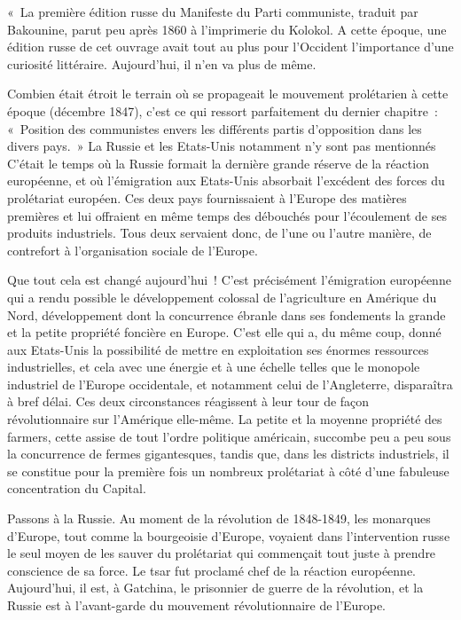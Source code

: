 \documentclass[french,twoside]{book} %
\newenvironment{quoteblock}%
  {\begin{quoting}}
  {\end{quoting}}
\newenvironment{quotebar}{%
    \def\FrameCommand{{\color{rubric!10!}\vrule width 0.5em} \hspace{0.9em}}%
    \def\OuterFrameSep{0pt} %
    \MakeFramed {\advance\hsize-\width \FrameRestore}
  }%
  {%
    \endMakeFramed
  }
\renewenvironment{quoteblock}%
  {%
    \savenotes
    \setstretch{0.9}
    \begin{quotebar}
    \smallskip
  }
  {%
    \smallskip
    \end{quotebar}
    \spewnotes
  }
\begin{document}
\begin{quoteblock}
 \noindent « La première édition russe du Manifeste du Parti communiste, traduit par Bakounine, parut peu après 1860 à l’imprimerie du Kolokol. A cette époque, une édition russe de cet ouvrage avait tout au plus pour l’Occident l’importance d’une curiosité littéraire. Aujourd’hui, il n’en va plus de même.\par
 Combien était étroit le terrain où se propageait le mouvement prolétarien à cette époque (décembre 1847), c’est ce qui ressort parfaitement du dernier chapitre : « Position des communistes envers les différents partis d’opposition dans les divers pays. » La Russie et les Etats-Unis notamment n’y sont pas mentionnés C’était le temps où la Russie formait la dernière grande réserve de la réaction européenne, et où l’émigration aux Etats-Unis absorbait l’excédent des forces du prolétariat européen. Ces deux pays fournissaient à l’Europe des matières premières et lui offraient en même temps des débouchés pour l’écoulement de ses produits industriels. Tous deux servaient donc, de l’une ou l’autre manière, de contrefort à l’organisation sociale de l’Europe.\par
 Que tout cela est changé aujourd’hui ! C'est précisément l’émigration européenne qui a rendu possible le développement colossal de l’agriculture en Amérique du Nord, développement dont la concurrence ébranle dans ses fondements la grande et la petite propriété foncière en Europe. C'est elle qui a, du même coup, donné aux Etats-Unis la possibilité de mettre en exploitation ses énormes ressources industrielles, et cela avec une énergie et à une échelle telles que le monopole industriel de l’Europe occidentale, et notamment celui de l’Angleterre, disparaîtra à bref délai. Ces deux circonstances réagissent à leur tour de façon révolutionnaire sur l’Amérique elle-même. La petite et la moyenne propriété des farmers, cette assise de tout l’ordre politique américain, succombe peu a peu sous la concurrence de fermes gigantesques, tandis que, dans les districts industriels, il se constitue pour la première fois un nombreux prolétariat à côté d’une fabuleuse concentration du Capital.\par
 Passons à la Russie. Au moment de la révolution de 1848-1849, les monarques d’Europe, tout comme la bourgeoisie d’Europe, voyaient dans l’intervention russe le seul moyen de les sauver du prolétariat qui commençait tout juste à prendre conscience de sa force. Le tsar fut proclamé chef de la réaction européenne. Aujourd’hui, il est, à Gatchina, le prisonnier de guerre de la révolution, et la Russie est à l’avant-garde du mouvement révolutionnaire de l’Europe.\par

\end{quoteblock}
\end{document}
